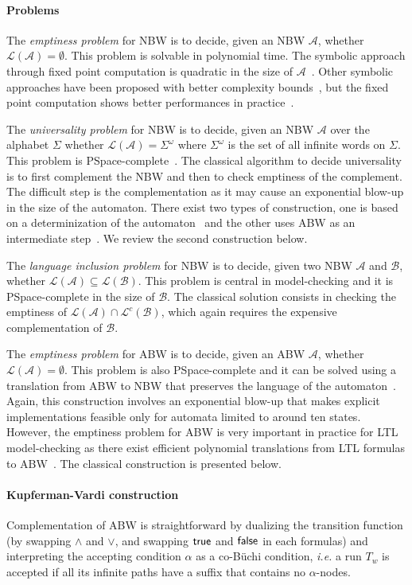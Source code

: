 \documentclass{LMCS}
\newcommand{\A}{\mathcal{A}}
\newcommand{\B}{\mathcal{B}}
\renewcommand{\L}{\mathcal{L}}
\newcommand{\true}{{\sf true}}
\newcommand{\false}{{\sf false}}
\begin{document}
\paragraph{{\bf Problems}} 
The \emph{emptiness problem} for NBW is to decide, given an NBW $\A$,
whether $\L(\A) = \emptyset$. This problem is solvable in
polynomial time. The symbolic approach through
fixed point computation is quadratic in the size of $\A$~\cite{EmmersonLei86}.
Other symbolic approaches have been proposed with better complexity bounds~\cite{BloemGS00,GentiliniPP03}, 
but the fixed point computation shows better performances in practice~\cite{RaviBS00}.

The \emph{universality problem} for NBW is to decide, given an NBW
$\A$ over the alphabet $\Sigma$ whether $\L(\A) = \Sigma^{\omega}$
where $\Sigma^{\omega}$ is the set of all infinite words on $\Sigma$.
This problem is {\sc PSpace}-complete~\cite{SVW87}.  The classical algorithm to
decide universality is to first complement the NBW and then to check
emptiness of the complement. The difficult step is the complementation
as it may cause an exponential blow-up in the size of the automaton.
There exist two types of construction, one is based on a
determinization of the automaton~\cite{Safra88} and the other uses ABW
as an intermediate step~\cite{kupferman97weak}. We review the second 
construction below.

The \emph{language inclusion problem} for NBW is to decide, given two
NBW $\A$ and $\B$, whether $\L(\A) \subseteq \L(\B)$. This
problem is central in model-checking and it is {\sc PSpace}-complete in the size of $\B$. 
The classical solution consists in checking the
emptiness of $\L(\A) \cap \L^c(\B)$, which again requires the
expensive complementation of $\B$.

The \emph{emptiness problem} for ABW is to decide, given an ABW $\A$,
whether $\L(\A) = \emptyset$. This problem is also {\sc
  PSpace}-complete and it can be solved using a translation from ABW
to NBW that preserves the language of the automaton~\cite{MiyanoH84}.
Again, this construction involves an exponential blow-up that makes
explicit implementations feasible only for automata limited to around
ten states. However, the emptiness problem for ABW is very important
in practice for LTL model-checking as there exist efficient polynomial
translations from LTL formulas to ABW~\cite{GastinOddoux}. The classical
construction is presented below.

\paragraph{{\bf Kupferman-Vardi construction}} 
Complementation of ABW is straightforward by dualizing the transition
function (by swapping $\land$ and $\lor$, and swapping $\true$ and
$\false$ in each formulas) and interpreting the accepting condition
$\alpha$ as a co-B\"uchi condition, {\it i.e.} a run $T_w$ is accepted
if all its infinite paths have a suffix that contains no $\alpha$-nodes.
\end{document}
